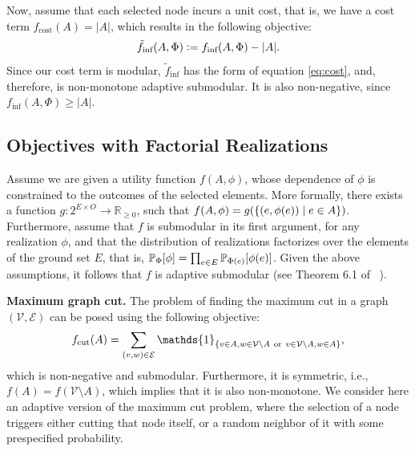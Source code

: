 \documentclass{article}
\newcommand{\defeq}{\vcentcolon=}
\let\originalleft\left
\let\originalright\right
\renewcommand{\left}{\mathopen{}\mathclose\bgroup\originalleft}
\renewcommand{\right}{\aftergroup\egroup\originalright}
\newcommand{\citet}[1]{\citeauthor{#1}~\shortcite{#1}}
\renewcommand{\paragraph}[1]{\vspace{0.3em}\noindent\textbf{#1.}\makebox[0.5em]{}}
\begin{document}
Now, assume that each selected node incurs a unit cost, that is, we have a cost term $f_{\textrm{cost}}(A) = |A|$, which results in the following objective:
\begin{align*}
  \tilde{f}_{\textrm{inf}}(A, \Phi) \defeq f_{\textrm{inf}}(A, \Phi) - |A|.
\end{align*}
Since our cost term is modular, $\tilde{f}_{\textrm{inf}}$ has the form of equation \eqref{eq:cost}, and, therefore, is non-monotone adaptive submodular.
It is also non-negative, since $f_{\textrm{inf}}(A, \Phi) \geq |A|$.

\subsection{Objectives with Factorial Realizations}
Assume we are given a utility function $f(A, \phi)$, whose dependence of $\phi$ is constrained to the outcomes of the selected elements.
More formally, there exists a function $g : 2^{E \times O} \to \mathbb{R}_{\geq 0}$, such that $f(A, \phi) = g\left(\{(e, \phi(e)) \mid e \in A\}\right)$.
Furthermore, assume that $f$ is submodular in its first argument, for any realization $\phi$, and that the distribution of realizations factorizes over the elements of the ground set $E$, that is, $\P[\Phi]{\phi} = \prod_{e \in E}\P[\Phi(e)]{\phi(e)}$.
Given the above assumptions, it follows that $f$ is adaptive submodular (see Theorem 6.1 of \citet{golovin11}).

\paragraph{Maximum graph cut}
The problem of finding the maximum cut in a graph $(\mathcal{V}, \mathcal{E})$ can be posed using the following objective:
\begin{align*}
  f_{\textrm{cut}}(A) = \sum_{(v, w) \in \mathcal{E}} \mathds{1}_{\left\{v \in A, w \in \mathcal{V}\setminus A\ \textrm{or}\ v \in \mathcal{V}\setminus A, w \in A\right\}},
\end{align*}
which is non-negative and submodular.
Furthermore, it is symmetric, i.e., $f(A) = f(\mathcal{V}\setminus A)$, which implies that it is also non-monotone.
We consider here an adaptive version of the maximum cut problem, where the selection of a node triggers either cutting that node itself, or a random neighbor of it with some prespecified probability.
\end{document}
